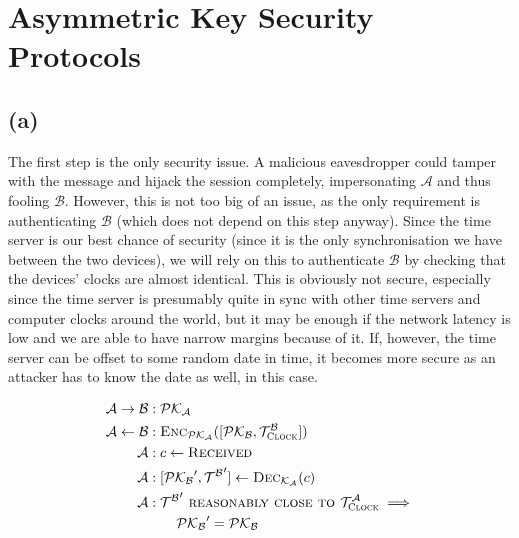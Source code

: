 \documentclass{article}
\begin{document}
\newpage
\section{Asymmetric Key Security Protocols}

\subsection*{(a)}

The first step is the only security issue.
A malicious eavesdropper could tamper with the message and hijack the session completely, impersonating $\mathcal A$ and thus fooling $\mathcal B$. However, this is not too big of an issue, as the only requirement is authenticating $\mathcal{B}$ (which does not depend on this step anyway).
Since the time server is our best chance of security (since it is the only synchronisation we have between the two devices), we will rely on this to authenticate $\mathcal{B}$ by checking that the devices' clocks are almost identical.
This is obviously not secure, especially since the time server is presumably quite in sync with other time servers and computer clocks around the world, but it may be enough if the network latency is low and we are able to have narrow margins because of it.
If, however, the time server can be offset to some random date in time, it becomes more secure as an attacker has to know the date as well, in this case.

\begin{align*}
    \mathcal A \rightarrow \mathcal B &: \mathcal{PK_A}
    \\
    \mathcal{A} \leftarrow \mathcal{B} &: \textsc{Enc}_{\mathcal{PK_A}}([\mathcal{PK_B}, \mathcal T_{\textsc{Clock}}^{\mathcal B}])
    \\
    \mathcal A &: c \leftarrow \textsc{Received}
    \\
    \mathcal A &: [\mathcal{PK_B}', \mathcal{T^B}'] \leftarrow \textsc{Dec}_{\mathcal{K_A}}(c)
    \\
    \mathcal A &: \mathcal{T^B}' \textsc{ reasonably close to } \mathcal{T}_{\textsc{Clock}}^{\mathcal A} \implies 
    \\ &\qquad \mathcal{PK_B}' = \mathcal{PK_B}
\end{align*}
\end{document}
